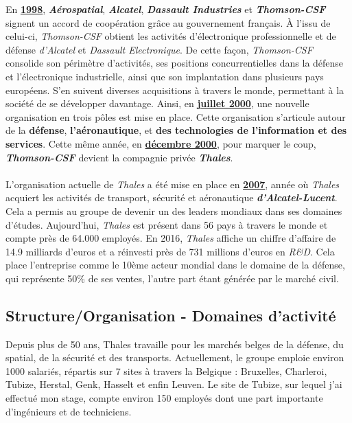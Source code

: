 \documentclass[10pt, oneside, a4paper]{article}
\begin{document}
En \underline{\textbf{1998}}, \textbf{\textit{Aérospatial}}, \textbf{\textit{Alcatel}}, \textbf{\textit{Dassault Industries}} et \textbf{\textit{Thomson-CSF}} signent un accord de coopération grâce au gouvernement français. À l’issu de celui-ci, \textit{Thomson-CSF} obtient les activités d’électronique professionnelle et de défense \textit{d’Alcatel} et \textit{Dassault Electronique}. De cette façon, \textit{Thomson-CSF} consolide son périmètre d'activités, ses positions concurrentielles dans la défense et l'électronique industrielle, ainsi que son implantation dans plusieurs pays européens. S'en suivent diverses acquisitions à travers le monde, permettant à la société de se développer davantage. Ainsi, en \underline{\textbf{juillet 2000}}, une nouvelle organisation en trois pôles est mise en place. Cette organisation s'articule autour de la \textbf{défense}, \textbf{l'aéronautique}, et \textbf{des technologies de l'information et des services}. Cette même année, en \underline{\textbf{décembre 2000}}, pour marquer le coup, \textbf{\textit{Thomson-CSF}} devient la compagnie privée \textbf{\textit{Thales}}. \\ \\
L’organisation actuelle de \textit{Thales} a été mise en place en \underline{\textbf{2007}}, année où \textit{Thales} acquiert les activités de transport, sécurité et aéronautique \textbf{\textit{d’Alcatel-Lucent}}. Cela a permis au groupe de devenir un des leaders mondiaux dans ses domaines d’études. Aujourd’hui, \textit{Thales} est présent dans 56 pays à travers le monde et compte près de 64.000 employés. En 2016, \textit{Thales} affiche un chiffre d’affaire de 14.9 milliards d’euros et a réinvesti près de 731 millions d’euros en \textit{R\&D}. Cela place l’entreprise comme le 10ème acteur mondial dans le domaine de la défense, qui représente 50\% de ses ventes, l’autre part étant générée par le marché civil. \\


\subsection{Structure/Organisation - Domaines d'activité}

Depuis plus de 50 ans, Thales travaille pour les marchés belges de la défense, du spatial, de la sécurité et des transports. Actuellement, le groupe emploie environ 1000 salariés, répartis sur 7 sites à travers la Belgique : Bruxelles, Charleroi, Tubize, Herstal, Genk, Hasselt et enfin Leuven. Le site de Tubize, sur lequel j'ai effectué mon stage, compte environ 150 employés dont une part importante d’ingénieurs et de techniciens. 
\end{document}

